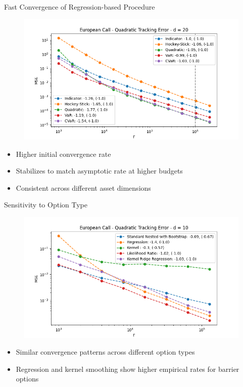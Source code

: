 \documentclass[9pt,handout]{beamer}
\begin{document}
\begin{frame}{Fast Convergence of Regression-based Procedure}

\begin{figure}
    \includegraphics[width=\textwidth]{../project1/figures/figure3.png}
\end{figure}

\begin{itemize}
    \item Higher initial convergence rate
    \item Stabilizes to match asymptotic rate at higher budgets
    \item Consistent across different asset dimensions
\end{itemize}

\end{frame}

\begin{frame}{Sensitivity to Option Type}

\begin{figure}
    \includegraphics[width=\textwidth]{../project1/figures/figure6a.png}
\end{figure}

\begin{itemize}
    \item Similar convergence patterns across different option types
    \item Regression and kernel smoothing show higher empirical rates for barrier options
\end{itemize}

\end{frame}
\end{document}
